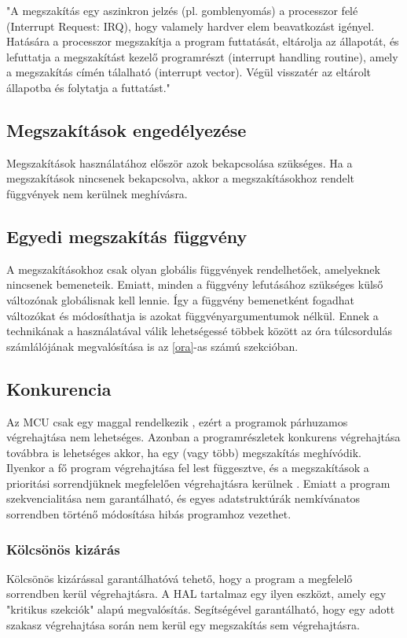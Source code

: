 "A megszakítás egy aszinkron jelzés (pl. gomblenyomás) a processzor felé (Interrupt Request: IRQ), hogy valamely hardver elem beavatkozást igényel.
Hatására a processzor megszakítja a program futtatását, eltárolja az állapotát, és lefuttatja a megszakítást kezelő programrészt (interrupt handling routine), amely a megszakítás címén tálalható (interrupt vector).
Végül visszatér az eltárolt állapotba és folytatja a futtatást."\cite{aradi2020jarmuvedezeti}
\subsection{Megszakítások engedélyezése}
Megszakítások használatához először azok bekapcsolása szükséges. Ha a megszakítások nincsenek bekapcsolva, akkor a megszakításokhoz rendelt függvények nem kerülnek meghívásra.

\subsection{Egyedi megszakítás függvény}
A megszakításokhoz csak olyan globális függvények rendelhetőek, amelyeknek nincsenek bemeneteik. Emiatt, minden a függvény lefutásához szükséges külső változónak globálisnak kell lennie.
Így a függvény bemenetként fogadhat változókat és módosíthatja is azokat függvényargumentumok nélkül. Ennek a technikának a használatával válik lehetségessé többek között az óra túlcsordulás számlálójának megvalósítása is az \ref{ora}-as számú szekcióban. 

\subsection{Konkurencia}
Az MCU csak egy maggal rendelkezik \cite{ATmega_processor_datasheet}, ezért a programok párhuzamos végrehajtása nem lehetséges.
Azonban a programrészletek konkurens végrehajtása továbbra is lehetséges akkor, ha egy (vagy több) megszakítás meghívódik.
Ilyenkor a fő program végrehajtása fel lest függesztve, és a megszakítások a prioritási sorrendjüknek megfelelően végrehajtásra kerülnek \cite{ATmega_processor_datasheet}.
Emiatt a program szekvencialitása nem garantálható, és egyes adatstruktúrák nemkívánatos sorrendben történő módosítása hibás programhoz vezethet.

\subsubsection{Kölcsönös kizárás}
Kölcsönös kizárással garantálhatóvá tehető, hogy a program a megfelelő sorrendben kerül végrehajtásra.
A HAL tartalmaz egy ilyen eszközt, amely egy "kritikus szekciók" alapú megvalósítás.
Segítségével garantálható, hogy egy adott szakasz végrehajtása során nem kerül egy megszakítás sem végrehajtásra.